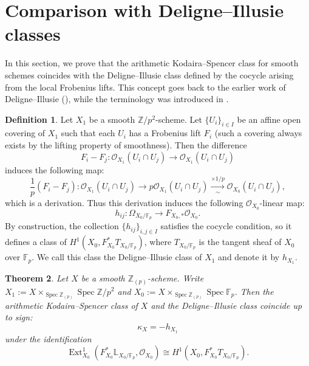 \documentclass[11pt, a4paper]{amsart}
\theoremstyle{plain}
\newtheorem{theorem}{Theorem}[section]
\theoremstyle{definition}
\newtheorem{definition}[theorem]{Definition}
\begin{document}
\section{Comparison with Deligne--Illusie classes}
In this section, we prove that the arithmetic Kodaira--Spencer class for smooth schemes coincides with the Deligne--Illusie class defined by the cocycle arising from the local Frobenius lifts. This concept goes back to the earlier work of Deligne--Illusie (\cite{DI87}), while the terminology was introduced in \cite{DKRZB17}.
\begin{definition}{\cite{DI87}}
    Let $X_1$ be a smooth $\mathbb Z/p^2$-scheme. Let $\{U_i\}_{i\in I}$ be an affine open covering of $X_1$ such that each $U_{i}$ has a Frobenius lift $F_i$ (such a covering always exists by the lifting property of smoothness). Then the difference \[F_i-F_j:\mathcal O_{X_1}(U_i\cap U_j)\to \mathcal O_{X_1}(U_i\cap U_j)\] induces the following map:\[\frac{1}{p}(F_i-F_j):\mathcal O_{X_1}(U_i\cap U_j)\to p\mathcal O_{X_1}(U_i\cap U_j)\xrightarrow[\sim]{\times 1/p}\mathcal O_{X_0}(U_i\cap U_j),\] which is a derivation. Thus this derivation induces the following $\mathcal O_{X_0}$-linear map:\[h_{ij}:\Omega_{X_0/\mathbb F_p}\to F_{X_0,*}\mathcal O_{X_0}.\] By construction, the collection $\{h_{ij}\}_{i,j\in I}$ satisfies the cocycle condition, so it defines a class of $H^1(X_0,F_{X_0}^*T_{X_0/\mathbb F_p})$, where $T_{X_0/\mathbb F_p}$ is the tangent sheaf of $X_0$ over $\mathbb F_p$. We call this class the Deligne--Illusie class of $X_1$ and denote it by $h_{X_1}$.
\end{definition}
\begin{theorem}
    Let $X$ be a smooth $\mathbb Z_{(p)}$-scheme. Write $X_1:=X\times _{\operatorname{Spec}\mathbb Z_{(p)}}\operatorname{Spec}\mathbb Z/p^2$ and $X_0:=X\times _{\operatorname{Spec}\mathbb Z_{(p)}}\operatorname{Spec}\mathbb F_p$. Then the arithmetic Kodaira--Spencer class of $X$ and the Deligne--Illusie class coincide up to sign:\[\kappa_X=-h_{X_1}\] under the identification \[\operatorname{Ext}^1_{X_0}(F^*_{X_0}\mathbb L_{X_0/\mathbb F_p},\mathcal O_{X_0})\cong H^1(X_0,F_{X_0}^*T_{X_0/\mathbb F_p}).\]
\end{theorem}
\end{document}
